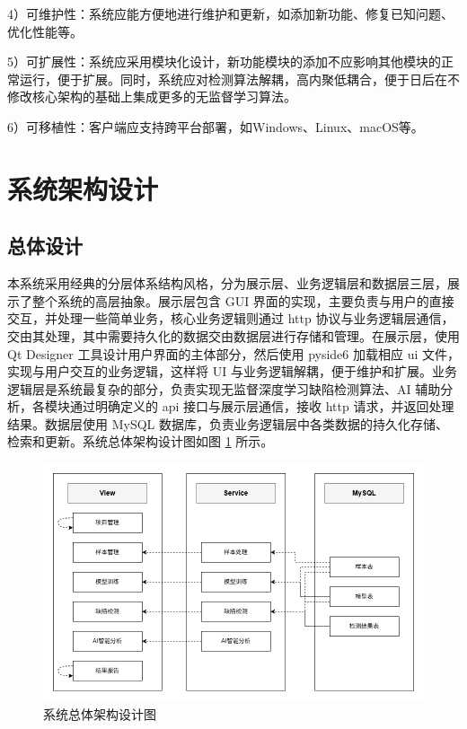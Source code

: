 \documentclass[
  ]{njuthesis}
\begin{document}
4）可维护性：系统应能方便地进行维护和更新，如添加新功能、修复已知问题、优化性能等。

5）可扩展性：系统应采用模块化设计，新功能模块的添加不应影响其他模块的正常运行，便于扩展。同时，系统应对检测算法解耦，高内聚低耦合，便于日后在不修改核心架构的基础上集成更多的无监督学习算法。

6）可移植性：客户端应支持跨平台部署，如Windows、Linux、macOS等。

\section{系统架构设计}

\subsection{总体设计}

本系统采用经典的分层体系结构风格，分为展示层、业务逻辑层和数据层三层，展示了整个系统的高层抽象。展示层包含 GUI 界面的实现，主要负责与用户的直接交互，并处理一些简单业务，核心业务逻辑则通过 http 协议与业务逻辑层通信，交由其处理，其中需要持久化的数据交由数据层进行存储和管理。在展示层，使用 Qt Designer 工具设计用户界面的主体部分，然后使用 pyside6 加载相应 ui 文件，实现与用户交互的业务逻辑，这样将 UI 与业务逻辑解耦，便于维护和扩展。业务逻辑层是系统最复杂的部分，负责实现无监督深度学习缺陷检测算法、AI 辅助分析，各模块通过明确定义的 api 接口与展示层通信，接收 http 请求，并返回处理结果。数据层使用 MySQL 数据库，负责业务逻辑层中各类数据的持久化存储、检索和更新。系统总体架构设计图如图 \ref{系统总体架构设计图} 所示。

\begin{figure}[htb]
    \centering
    \includegraphics[width=\textwidth]{images/系统总体架构设计图.png}
    \caption{系统总体架构设计图}
    \label{系统总体架构设计图}
\end{figure}
\end{document}

